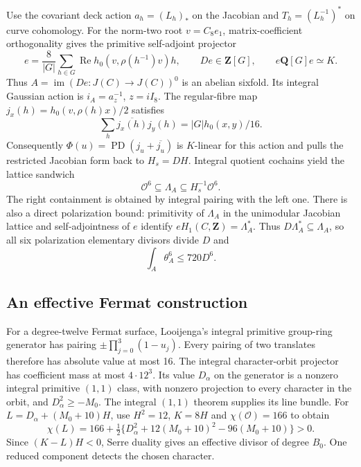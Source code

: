 \documentclass[11pt]{article}
\theoremstyle{definition}
\theoremstyle{remark}
\begin{document}
Use the covariant deck action $a_h=(L_h)_*$ on the Jacobian and
$T_h=(L_h^{-1})^*$ on curve cohomology.
For the norm-two root $v=C_8e_1$, matrix-coefficient orthogonality gives
the primitive self-adjoint projector
\[
 e=\frac8{|G|}\sum_{h\in G}
       \operatorname{Re}h_0(v,\rho(h^{-1})v)h,\qquad
 De\in\mathbf Z[G],\qquad e\mathbf Q[G]e\simeq K.
\]
Thus $A=\operatorname{im}(De:J(C)\to J(C))^0$ is an abelian sixfold.
Its integral Gaussian action is $i_A=a_z^{-1}$, $z=iI_8$.
The regular-fibre map $j_x(h)=h_0(v,\rho(h)x)/2$ satisfies
\[
 \sum_h\overline{j_x(h)}j_y(h)=|G|h_0(x,y)/16.
\]
Consequently $\Phi(u)=\operatorname{PD}(j_u+\overline{j_u})$ is
$K$-linear for this action and pulls the restricted Jacobian form back
to $H_s=DH$.  Integral quotient cochains yield the lattice sandwich
\begin{equation}\label{eq:gaussian-discriminant-lattice}
             \mathcal O^6\subseteq\Lambda_A
                              \subseteq H_s^{-1}\mathcal O^6.
\end{equation}
The right containment is obtained by integral pairing with the left
one.  There is also a direct polarization bound:
primitivity of $\Lambda_A$ in the unimodular Jacobian lattice and
self-adjointness of $e$ identify $eH_1(C,\mathbf Z)=\Lambda_A^*$.
Thus $D\Lambda_A^*\subseteq\Lambda_A$, so all six polarization
elementary divisors divide $D$ and
\begin{equation}\label{eq:gaussian-discriminant-volume}
                         \int_A\theta_A^6\le720D^6.
\end{equation}

\subsection{An effective Fermat construction}

For a degree-twelve Fermat surface, Looijenga's integral primitive
group-ring generator \cite[Corollary~2.2]{LooijengaFermat} has pairing $\pm\prod_{j=0}^3(1-u_j)$.
Every pairing of two translates therefore has absolute value at most
16.  The integral character-orbit projector has coefficient mass at
most $4\cdot12^3$.  Its value $D_\alpha$ on the generator is a nonzero
integral primitive $(1,1)$ class, with nonzero projection to every
character in the orbit, and $D_\alpha^2\ge-M_0$.
The integral $(1,1)$ theorem supplies its line bundle.
For $L=D_\alpha+(M_0+10)H$, use $H^2=12$, $K=8H$ and
$\chi(\mathcal O)=166$ to obtain
\[
 \chi(L)=166+\tfrac12\{D_\alpha^2+
              12(M_0+10)^2-96(M_0+10)\}>0.
\]
Since $(K-L)H<0$, Serre duality gives an effective divisor of degree
$B_0$.  One reduced component detects the chosen character.
\end{document}
